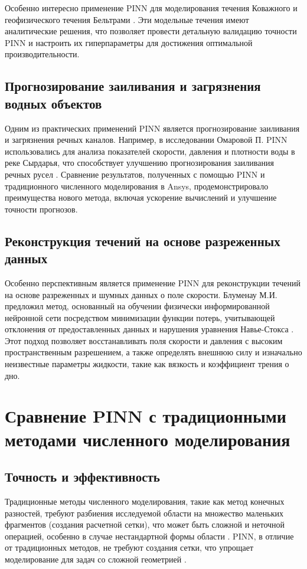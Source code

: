 Особенно интересно применение PINN для моделирования течения Коважного и геофизического течения
Бельтрами \cite{raissi2020hidden}. Эти модельные течения имеют аналитические решения, что позволяет провести
детальную валидацию точности PINN и настроить их гиперпараметры для достижения оптимальной производительности.

\subsection{Прогнозирование заиливания и загрязнения водных объектов}
Одним из практических применений PINN является прогнозирование заиливания и загрязнения речных каналов. Например,
в исследовании Омаровой П. PINN использовались для анализа показателей скорости, давления и плотности воды в реке
Сырдарья, что способствует улучшению прогнозирования заиливания речных русел \cite{omarova2022syrdarya}.
Сравнение результатов, полученных с помощью PINN и традиционного численного моделирования в Ansys, продемонстрировало
преимущества нового метода, включая ускорение вычислений и улучшение точности прогнозов.

\subsection{Реконструкция течений на основе разреженных данных}
Особенно перспективным является применение PINN для реконструкции течений на основе разреженных и шумных данных
о поле скорости. Блуменау М.И. предложил метод, основанный на обучении физически информированной нейронной сети
посредством минимизации функции потерь, учитывающей отклонения от предоставленных данных и нарушения уравнения
Навье-Стокса \cite{blumenau2021reconstruction}. Этот подход позволяет восстанавливать поля скорости и давления
с высоким пространственным разрешением, а также определять внешнюю силу и изначально неизвестные параметры
жидкости, такие как вязкость и коэффициент трения о дно.

\section{Сравнение PINN с традиционными методами численного моделирования}
\subsection{Точность и эффективность}
Традиционные методы численного моделирования, такие как метод конечных разностей, требуют разбиения исследуемой области
на множество маленьких фрагментов (создания расчетной сетки), что может быть сложной и неточной операцией, особенно в
случае нестандартной формы области \cite{ferziger2019computational}. PINN, в отличие от традиционных методов, не требуют
создания сетки, что упрощает моделирование для задач со сложной геометрией \cite{karniadakis2021physics}.

